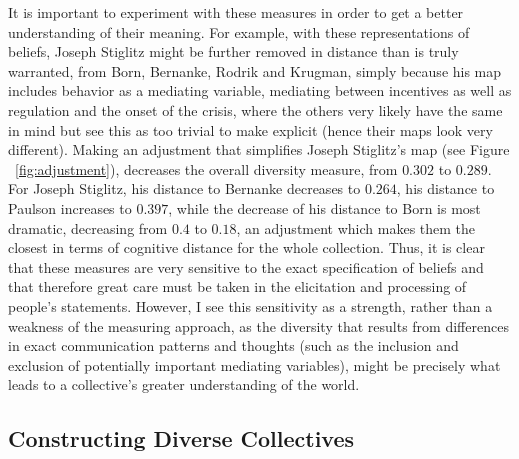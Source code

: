 \documentclass[12pt]{article}
\begin{document}
It is important to experiment with these measures in order to get a better understanding of their meaning. For example, with these representations of beliefs, Joseph Stiglitz might be further removed in distance than is truly warranted, from Born, Bernanke, Rodrik and Krugman, simply because his map includes behavior as a mediating variable, mediating between incentives as well as regulation and the onset of the crisis, where the others very likely have the same in mind but see this as too trivial to make explicit (hence their maps look very different). Making an adjustment that simplifies Joseph Stiglitz's map (see Figure ~\ref{fig:adjustment}), decreases the overall diversity measure, from $0.302$ to $0.289$. For Joseph Stiglitz, his distance to Bernanke decreases to $0.264$, his distance to Paulson increases to $0.397$, while the decrease of his distance to Born is most dramatic, decreasing from $0.4$ to $0.18$, an adjustment which makes them the closest in terms of cognitive distance for the whole collection. Thus, it is clear that these measures are very sensitive to the exact specification of beliefs and that therefore great care must be taken in the elicitation and processing of people's statements. However, I see this sensitivity as a strength, rather than a weakness of the measuring approach, as the diversity that results from differences in exact communication patterns and thoughts (such as the inclusion and exclusion of potentially important mediating variables), might be precisely what leads to a collective's greater understanding of the world.

\subsection*{Constructing Diverse Collectives}
\end{document}
